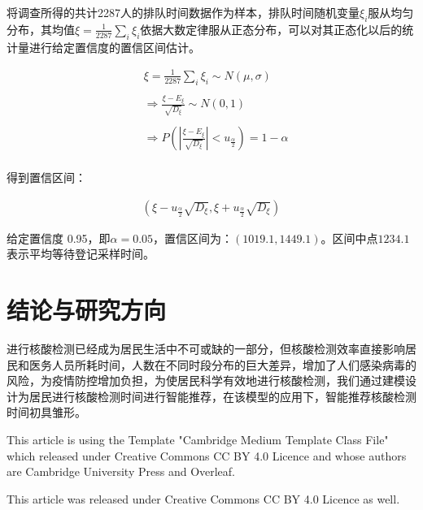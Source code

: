 \documentclass[
  journal=,
  manuscript=,
  year=2022,
  volume=01,
]{cup-journal}
\begin{document}
\par 将调查所得的共计2287人的排队时间数据作为样本，排队时间随机变量$\xi_{i}$服从均匀分布，其均值$\xi=\frac{1}{2287}\sum_{i}\xi_{i}$依据大数定律服从正态分布，可以对其正态化以后的统计量进行给定置信度的置信区间估计。

\begin{equation}
	\begin{aligned}
		& \xi=\frac{1}{2287}\sum_{i}\xi_{i} \sim N \left ( \mu, \sigma \right ) \\ \\
		& \Longrightarrow \frac{\xi-E_{\xi}}{\sqrt{D_{\xi}}} \sim N \left ( 0,1 \right ) \\ \\
		& \Longrightarrow P \left ( \left | \frac{\xi-E_{\xi}}{\sqrt{D_{\xi}}} \right | < u_{\frac{\alpha}{2}} \right ) = 1-\alpha \\
	\end{aligned}
\end{equation}

\par 得到置信区间：

\begin{equation}
	\begin{aligned}
		\left ( \xi - u_{\frac{\alpha}{2}} \sqrt{D_{\xi}} , \xi + u_{\frac{\alpha}{2}} \sqrt{D_{\xi}} \right )
	\end{aligned}
\end{equation}

\par 给定置信度 0.95，即$\alpha=0.05$，置信区间为：$\left ( 1019.1,1449.1 \right )$。区间中点$1234.1$表示平均等待登记采样时间。

\section{结论与研究方向}

\par 进行核酸检测已经成为居民生活中不可或缺的一部分，但核酸检测效率直接影响居民和医务人员所耗时间，人数在不同时段分布的巨大差异，增加了人们感染病毒的风险，为疫情防控增加负担，为使居民科学有效地进行核酸检测，我们通过建模设计为居民进行核酸检测时间进行智能推荐，在该模型的应用下，智能推荐核酸检测时间初具雏形。

\begin{acknowledgement}

	This article is using the Template "Cambridge Medium Template Class File" which released under Creative Commons CC BY 4.0 Licence and whose authors are Cambridge University Press and Overleaf. 

This article was released under Creative Commons CC BY 4.0 Licence as well. 

\end{acknowledgement}
\end{document}
